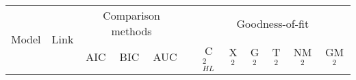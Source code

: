 \begin{tabular}{clcccccccccc}
\toprule
\multirow{2}{*}{Model}   & \multirow{2}{*}{Link}   & \multicolumn{3}{c}{Comparison methods}   &   & \multicolumn{6}{c}{Goodness-of-fit}   \\
\cmidrule{3-5}\cmidrule{7-12}
       &           & AIC       & BIC       & AUC     &   & C$_{HL}^{2}$ & X$^{2}$  & G$^{2}$  & T$^{2}$  & NM$^{2}$ & GM$^{2}$ \\ 
\midrule

\end{tabular}
